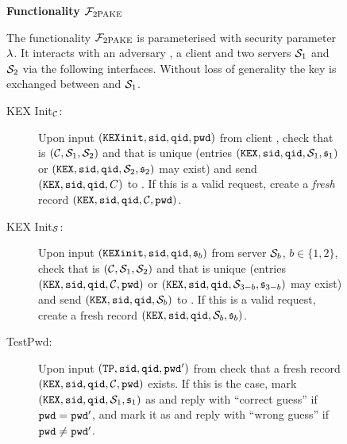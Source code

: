 \begin{figure}[tbp]
\begin{mdframed}[innertopmargin=10pt]
\begin{center}
{\bf Functionality $\mathcal{F}_{\mathrm{2PAKE}}$}
\end{center}
The functionality $\mathcal{F}_{\mathrm{2PAKE}}$ is parameterised with security parameter $\lambda$.
It interacts with an adversary \SIM, a client \Client and two servers $\mathcal{S}_1$ and $\mathcal{S}_2$ via the following interfaces.
Without loss of generality the key is exchanged between \Client and $\mathcal{S}_1$.

\begin{description}

  \item[KEX Init$_\mathcal{C}$:] Upon input $(\mathtt{KEXinit}, \mathtt{sid}, \mathtt{qid}, \mathtt{pwd})$ from client \Client, check that \sid is $(\mathcal{C}, \mathcal{S}_1, \mathcal{S}_2)$ and that \qid is unique (entries $(\mathtt{KEX}, \mathtt{sid}, \mathtt{qid}, \mathcal{S}_{1}, \mathfrak{s}_{1})$ or $(\mathtt{KEX}, \mathtt{sid}, \mathtt{qid}, \mathcal{S}_{2}, \mathfrak{s}_{2})$ may exist) and send $(\mathtt{KEX}, \mathtt{sid}, \mathtt{qid}, C)$ to \SIM.
      If this is a valid request, create a \emph{fresh} record $(\mathtt{KEX}, \mathtt{sid}, \mathtt{qid}, \mathcal{C}, \mathtt{pwd})$.
  
  \item[KEX Init$_\mathcal{S}$:] Upon input $(\mathtt{KEXinit}, \mathtt{sid}, \mathtt{qid}, \mathfrak{s}_b)$ from server $\mathcal{S}_b$, $b\in\{1,2\}$, check that \sid is $(\mathcal{C}, \mathcal{S}_1, \mathcal{S}_2)$ and that \qid is unique (entries $(\mathtt{KEX}, \mathtt{sid}, \mathtt{qid}, \mathcal{C}, \mathtt{pwd})$ or $(\mathtt{KEX}, \mathtt{sid}, \mathtt{qid}, \mathcal{S}_{3-b}, \mathfrak{s}_{3-b})$ may exist) and send $(\mathtt{KEX}, \mathtt{sid}, \mathtt{qid}, \mathcal{S}_b)$ to \SIM.
      If this is a valid request, create a fresh record $(\mathtt{KEX}, \mathtt{sid}, \mathtt{qid}, \mathcal{S}_b, \mathfrak{s}_b)$.
    
  \item[TestPwd:] Upon input $(\mathtt{TP}, \mathtt{sid}, \mathtt{qid}, \mathtt{pwd}')$ from \SIM check that a fresh record $(\mathtt{KEX}, \mathtt{sid}, \mathtt{qid}, \mathcal{C}, \mathtt{pwd})$ exists. 
      If this is the case, mark $(\mathtt{KEX}, \mathtt{sid}, \mathtt{qid}, \mathcal{S}_1, \mathfrak{s}_1)$ as \compromised and reply with ``correct guess'' if $\mathtt{pwd}=\mathtt{pwd}'$, and mark it as \interrupted and reply with ``wrong guess'' if $\mathtt{pwd}\not=\mathtt{pwd}'$.
    
      

\end{description}
\end{mdframed}
\end{figure}

